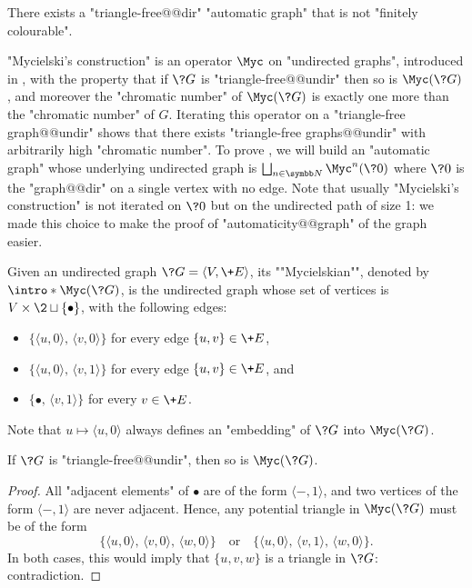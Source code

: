 \begin{proposition}
	\AP\label{prop:automatic-graph-not-fin-colourable}
	There exists a "triangle-free@@dir" "automatic graph" that is not "finitely colourable".
\end{proposition}

"Mycielski's construction" is an operator $\Myc$ on "undirected graphs",
introduced in \cite{Mycielski55Coloriage}, with the property that if $\?G$ is "triangle-free@@undir"
then so is $\Myc(\?G)$, and moreover
the "chromatic number" of $\Myc(\?G)$ is exactly one more than the "chromatic number" of $G$.
Iterating this operator on a "triangle-free graph@@undir" shows that there exists
"triangle-free graphs@@undir" with arbitrarily high "chromatic number".
To prove , we will build
an "automatic graph" whose underlying undirected graph is
$\bigdcup_{n\in\N} \Myc^n(\?0)$ where $\?0$ is the "graph@@dir" on a single vertex with no edge.
Note that usually "Mycielski's construction" is not iterated on $\?0$ but on the undirected
path of size 1: we made this choice to make the proof of "automaticity@@graph" of the graph
easier.

\begin{definition}
	Given an undirected graph $\?G = \langle V, \+E \rangle$, its \AP""Mycielskian"",
	denoted by \AP$\intro*\Myc(\?G)$, is the undirected graph whose set of vertices is
	$V\times\2 \dcup \set{\bullet}$, with the following edges:
	\begin{itemize}
		\item $\{\langle u, 0 \rangle,\, \langle v, 0 \rangle\}$
			for every edge $\{ u,v \} \in \+E$,
		\item $\{\langle u, 0 \rangle,\, \langle v, 1 \rangle\}$
			for every edge $\{ u,v \} \in \+E$, and
		\item $\{ \bullet,\, \langle v, 1 \rangle\}$
			for every $v \in \+E$.
	\end{itemize}
\end{definition}

Note that $u \mapsto \langle u,0\rangle$ always defines an "embedding" of
$\?G$ into $\Myc(\?G)$.

\begin{property}
	\label{prop:triangle-free}
	If $\?G$ is "triangle-free@@undir", then so is $\Myc(\?G)$.
\end{property}

\begin{proof}
	All "adjacent elements" of $\bullet$ are of the form $\langle -, 1\rangle$,
	and two vertices of the form $\langle -, 1\rangle$ are never adjacent.
	Hence, any potential triangle in $\Myc(\?G)$ must be of the form
	\[
	\{
		\langle u, 0 \rangle,\,
		\langle v, 0 \rangle,\,
		\langle w, 0 \rangle
	\}
	\quad\text{or}\quad
	\{
		\langle u, 0 \rangle,\,
		\langle v, 1 \rangle,\,
		\langle w, 0 \rangle
	\}.
	\]
	In both cases, this would imply that $\{u,v,w\}$ is a triangle in $\?G$:
	contradiction.
\end{proof}

